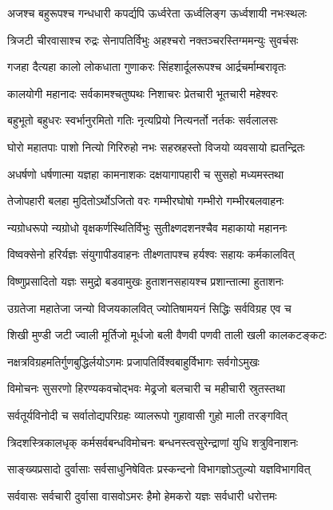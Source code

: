 \twolineshloka
{अजश्च बहुरूपश्च गन्धधारी कपर्द्यपि}%
{ऊर्ध्वरेता ऊर्ध्वलिङ्ग ऊर्ध्वशायी नभःस्थलः}%

\twolineshloka
{त्रिजटी चीरवासाश्च रुद्रः सेनापतिर्विभुः}%
{अहश्चरो नक्तञ्चरस्तिग्ममन्युः सुवर्चसः}%

\twolineshloka
{गजहा दैत्यहा कालो लोकधाता गुणाकरः}%
{सिंहशार्दूलरूपश्च आर्द्रचर्माम्बरावृतः}%

\twolineshloka
{कालयोगी महानादः सर्वकामश्चतुष्पथः}%
{निशाचरः प्रेतचारी भूतचारी महेश्वरः}%

\twolineshloka
{बहुभूतो बहुधरः स्वर्भानुरमितो गतिः}%
{नृत्यप्रियो नित्यनर्तो नर्तकः सर्वलालसः}%

\twolineshloka
{घोरो महातपाः पाशो नित्यो गिरिरुहो नभः}%
{सहस्रहस्तो विजयो व्यवसायो ह्यतन्द्रितः}%

\twolineshloka
{अधर्षणो धर्षणात्मा यज्ञहा कामनाशकः}%
{दक्षयागापहारी च सुसहो मध्यमस्तथा}%

\twolineshloka
{तेजोपहारी बलहा मुदितोऽर्थोऽजितो वरः}%
{गम्भीरघोषो गम्भीरो गम्भीरबलवाहनः}%

\twolineshloka
{न्यग्रोधरूपो न्यग्रोधो वृक्षकर्णस्थितिर्विभुः}%
{सुतीक्ष्णदशनश्चैव महाकायो महाननः}%

\twolineshloka
{विष्वक्सेनो हरिर्यज्ञः संयुगापीडवाहनः}%
{तीक्ष्णतापश्च हर्यश्वः सहायः कर्मकालवित्}%

\twolineshloka
{विष्णुप्रसादितो यज्ञः समुद्रो बडवामुखः}%
{हुताशनसहायश्च प्रशान्तात्मा हुताशनः}%

\twolineshloka
{उग्रतेजा महातेजा जन्यो विजयकालवित्}%
{ज्योतिषामयनं सिद्धिः सर्वविग्रह एव च}%

\twolineshloka
{शिखी मुण्डी जटी ज्वाली मूर्तिजो मूर्धजो बली}%
{वैणवी पणवी ताली खली कालकटङ्कटः}%

\twolineshloka
{नक्षत्रविग्रहमतिर्गुणबुद्धिर्लयोऽगमः}%
{प्रजापतिर्विश्वबाहुर्विभागः सर्वगोऽमुखः}%

\twolineshloka
{विमोचनः सुसरणो हिरण्यकवचोद्भवः}%
{मेढ्रजो बलचारी च महीचारी स्रुतस्तथा}%

\twolineshloka
{सर्वतूर्यविनोदी च सर्वातोद्यपरिग्रहः}%
{व्यालरूपो गुहावासी गुहो माली तरङ्गवित्}%

\twolineshloka
{त्रिदशस्त्रिकालधृक् कर्मसर्वबन्धविमोचनः}%
{बन्धनस्त्वसुरेन्द्राणां युधि शत्रुविनाशनः}%

\twolineshloka
{साङ्ख्यप्रसादो दुर्वासाः सर्वसाधुनिषेवितः}%
{प्रस्कन्दनो विभागज्ञोऽतुल्यो यज्ञविभागवित्}%

\twolineshloka
{सर्ववासः सर्वचारी दुर्वासा वासवोऽमरः}%
{हैमो हेमकरो यज्ञः सर्वधारी धरोत्तमः}%

